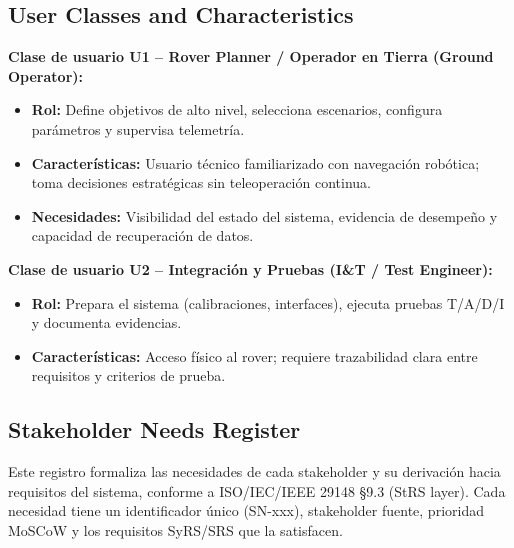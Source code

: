 \subsection{User Classes and Characteristics}

\textbf{Clase de usuario U1 – Rover Planner / Operador en Tierra (Ground Operator):}
\begin{itemize}
    \item \textbf{Rol:} Define objetivos de alto nivel, selecciona escenarios, configura parámetros y supervisa telemetría.
    \item \textbf{Características:} Usuario técnico familiarizado con navegación robótica; toma decisiones estratégicas sin teleoperación continua.
    \item \textbf{Necesidades:} Visibilidad del estado del sistema, evidencia de desempeño y capacidad de recuperación de datos.
\end{itemize}

\textbf{Clase de usuario U2 – Integración y Pruebas (I\&T / Test Engineer):}
\begin{itemize}
    \item \textbf{Rol:} Prepara el sistema (calibraciones, interfaces), ejecuta pruebas T/A/D/I y documenta evidencias.
    \item \textbf{Características:} Acceso físico al rover; requiere trazabilidad clara entre requisitos y criterios de prueba.
\end{itemize}

\subsection{Stakeholder Needs Register}\label{subsec:stakeholder_needs}

Este registro formaliza las necesidades de cada stakeholder y su derivación hacia requisitos del sistema, conforme a ISO/IEC/IEEE 29148 §9.3 (StRS layer). Cada necesidad tiene un identificador único (SN-xxx), stakeholder fuente, prioridad MoSCoW y los requisitos SyRS/SRS que la satisfacen.

